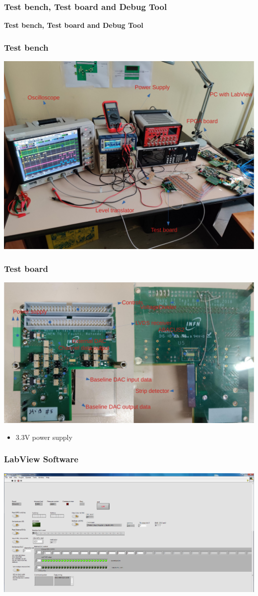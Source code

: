 \documentclass[aspectratio=169]{beamer}
\begin{document}
	\begin{frame}
	\frametitle{Test bench, Test board and Debug Tool}
	\begin{center}
		{\Huge {}\selectfont \color{blue} \textbf{Test bench, Test board and Debug Tool}}
	\end{center}
	\end{frame}


	\begin{frame}
	\frametitle{Test bench}
	\begin{center}
		\includegraphics[width=0.65 \textwidth]{IMG/TestBench.pdf}
	\end{center}
	\end{frame}

	\begin{frame}
	\frametitle{Test board}
	\begin{center}
		\includegraphics[width=0.7 \textwidth]{IMG/TestBoard.pdf}
	\end{center}
	\begin{itemize}
		\item 3.3V power supply
	\end{itemize}
	\end{frame}

	\begin{frame}
	\frametitle{LabView Software}
	\begin{center}
		\includegraphics[width=0.8 \textwidth]{IMG/LabVIEWBaselineDac.PNG}
	\end{center}
	
	\end{frame}
\end{document}
